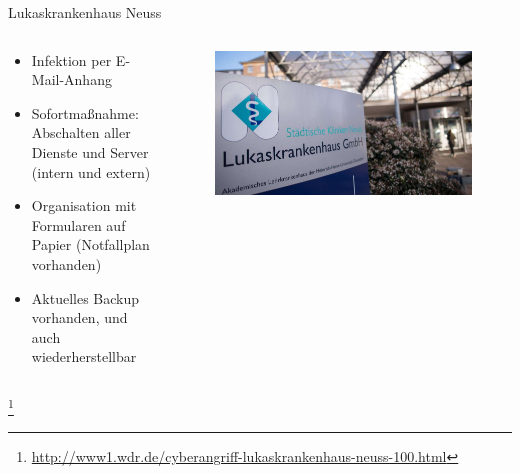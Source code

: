 \documentclass[10pt]{beamer}
\begin{document}

\begin{frame}{Lukaskrankenhaus Neuss}
	\begin{columns}
		\begin{column}{6cm}		
			\begin{itemize}
				\item Infektion per E-Mail-Anhang
				\item Sofortmaßnahme: Abschalten aller Dienste und Server (intern und extern)
				\item Organisation mit Formularen auf Papier (Notfallplan vorhanden)
				\item Aktuelles Backup vorhanden, und auch wiederherstellbar
			\end{itemize}
		\end{column}
		\begin{column}{5cm}
			\begin{figure}[p]
				\centering
				\includegraphics[scale=0.5]{lukaskrankenhaus.jpg}
			\end{figure}
		\end{column}
	\end{columns}
	\let\thefootnote\relax\footnote{\url{http://www1.wdr.de/cyberangriff-lukaskrankenhaus-neuss-100.html}}
\end{frame}
\end{document}
